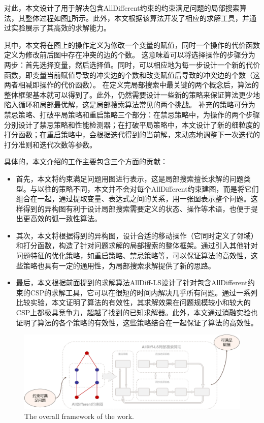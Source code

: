 对此，本文设计了用于解决包含AllDifferent约束的约束满足问题的局部搜索算法，其整体过程如图\ref{fig:total}所示。此外，本文根据该算法开发了相应的求解工具，并通过实验展示了其高效的求解能力。

其中，本文将在图上的操作定义为修改一个变量的赋值，同时一个操作的代价函数定义为修改前后图中存在冲突的边的个数。
这意味着可以将选择操作的步骤分为两步：首先选择变量，然后选择值。同时，可以相应地为每一步设计一个新的代价函数，即变量当前赋值导致的冲突边的个数和改变赋值后导致的冲突边的个数（这两者相减即操作的代价函数）。
在定义完局部搜索中最关键的两个概念后，算法的整体框架基本就可以得到了。此外，仍然需要设计一些新的策略来保证算法更少地陷入循环和局部最优解，这是局部搜索算法常见的两个挑战。
补充的策略可分为禁忌策略、打破平局策略和重启策略三个部分：在禁忌策略中，为操作的两个步骤分别设计了禁忌策略和性能检测器；在打破平局策略中，本文设计了新的细粒度的打分函数；在重启策略中，会根据迭代得到的当前解，来动态地调整下一次迭代的打分准则和迭代次数等参数。

具体的，本文介绍的工作主要包含三个方面的贡献：
\begin{itemize}
    \item 首先，本文将约束满足问题用图进行表示，这是局部搜索擅长求解的问题类型。与以往的策略不同，本文并不会对每个AllDifferent约束建图，而是将它们组合在一起，通过提取变量、表达式之间的关系，用一张图表示整个问题。这样得到的异构图有利于设计局部搜索需要定义的状态、操作等术语，也便于提出更高效的弧一致性算法。
    \item 其次，本文将根据得到的异构图，设计合适的移动操作（它同时定义了邻域）和打分函数，构造了针对问题求解的局部搜索的整体框架。通过引入其他针对问题特征的优化策略，如重启策略、禁忌策略等，可以保证算法的高效性，这些策略也具有一定的通用性，为局部搜索求解提供了新的思路。
    \item 最后，本文根据前面提到的求解算法AllDiff-LS设计了针对包含AllDifferent约束的CSP的求解工具，它可以在很短的时间内解决几乎所有问题。通过一系列比较实验，本文证明了算法的有效性，其求解效果在问题规模较小和较大的CSP上都极具竞争力，超越了找到的已知求解器。此外，本文通过消融实验也证明了算法的各个策略的有效性，这些策略结合在一起保证了算法的高效性。
\end{itemize}

\begin{figure}[]
    \centering
    \includegraphics[width=0.9\columnwidth]{Img/all.png}
     {The overall framework of the work.}
    \label{fig:total}
\end{figure}

